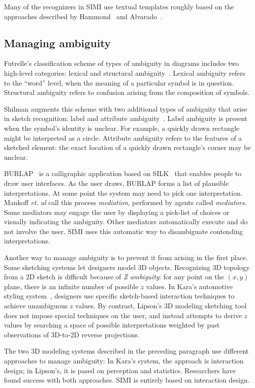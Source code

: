 Many of the recognizers in SIMI use textual templates roughly based on
the approaches described by Hammond~\cite{hammond-ladder} and
Alvarado~\cite[Chapter 4]{alvarado-phd-thesis}.

\subsection{Managing ambiguity}
\label{sec:recognition-managing-ambiguity}

Futrelle's classification scheme of types of ambiguity in diagrams
includes two high-level categories: lexical and structural
ambiguity~\cite{futrelle-ambigutiy}. Lexical ambiguity refers to the
``word'' level, when the meaning of a particular symbol is in
question. Structural ambiguity refers to confusion arising from the
composition of symbols.

Shilman augments this scheme with two additional types of ambiguity
that arise in sketch recognition: label and attribute
ambiguity~\cite{shilman-parsing}. Label ambiguity is present when the
symbol's identity is unclear. For example, a quickly drawn rectangle
might be interpreted as a circle. Attribute ambiguity refers to the
features of a sketched element: the exact location of a quickly drawn
rectangle's corner may be unclear.

BURLAP~\cite{mankoff-burlap} is a calligraphic application based on
SILK~\cite{landay-silk} that enables people to draw user
interfaces. As the user draws, BURLAP forms a list of plausible
interpretations. At some point the system may need to pick one
interpretation. Mankoff \textit{et. al} call this process
\textit{mediation}, performed by agents called
\textit{mediators}. Some mediators may engage the user by displaying a
pick-list of choices or visually indicating the ambiguity. Other
mediators automatically execute and do not involve the user. SIMI
uses this automatic way to disambiguate contending interpretations.

Another way to manage ambiguity is to prevent it from arising in the
first place. Some sketching systems let designers model 3D
objects. Recognizing 3D topology from a 2D sketch is difficult because
of \textit{Z ambiguity}: for any point on the $(x, y)$ plane, there is
an infinite number of possible $z$ values. In Kara's automotive
styling system~\cite{kara-3d-styling}, designers use specific
sketch-based interaction techniques to achieve unambiguous $z$
values. By contrast, Lipson's 3D modeling sketching
tool~\cite{lipson-correlation} does not impose special techniques on
the user, and instead attempts to derive $z$ values by searching a
space of possible interpretations weighted by past observations of
3D-to-2D reverse projections.

The two 3D modeling systems described in the preceding paragraph use
different approaches to manage ambiguity: In Kara's system, the
approach is interaction design; in Lipson's, it is pased on perception
and statistics. Researchers have found success with both
approaches. SIMI is entirely based on interaction design.

